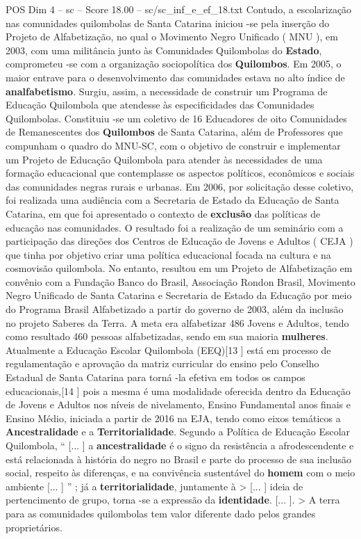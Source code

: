 \begin{textsample}{POS Dim 4 – sc – Score 18.00 – sc/sc\_inf\_e\_ef\_18.txt}
Contudo, a escolarização nas comunidades quilombolas de Santa Catarina iniciou -se pela inserção do Projeto de Alfabetização, no qual o Movimento Negro Unificado ( MNU ), em 2003, com uma militância junto às Comunidades Quilombolas do \textbf{Estado}, comprometeu -se com a organização sociopolítica dos \textbf{Quilombos}.
Em 2005, o maior entrave para o desenvolvimento das comunidades estava no alto índice de \textbf{analfabetismo}.
Surgiu, assim, a necessidade de construir um Programa de Educação Quilombola que atendesse às especificidades das Comunidades Quilombolas.
Constituiu -se um coletivo de 16 Educadores de oito Comunidades de Remanescentes dos \textbf{Quilombos} de Santa Catarina, além de Professores que compunham o quadro do MNU-SC, com o objetivo de construir e implementar um Projeto de Educação Quilombola para atender às necessidades de uma formação educacional que contemplasse os aspectos políticos, econômicos e sociais das comunidades negras rurais e urbanas.
Em 2006, por solicitação desse coletivo, foi realizada uma audiência com a Secretaria de Estado da Educação de Santa Catarina, em que foi apresentado o contexto de \textbf{exclusão} das políticas de educação nas comunidades.
O resultado foi a realização de um seminário com a participação das direções dos Centros de Educação de Jovens e Adultos ( CEJA ) que tinha por objetivo criar uma política educacional focada na cultura e na cosmovisão quilombola.
No entanto, resultou em um Projeto de Alfabetização em convênio com a Fundação Banco do Brasil, Associação Rondon Brasil, Movimento Negro Unificado de Santa Catarina e Secretaria de Estado da Educação por meio do Programa Brasil Alfabetizado a partir do governo de 2003, além da inclusão no projeto Saberes da Terra.
A meta era alfabetizar 486 Jovens e Adultos, tendo como resultado 460 pessoas alfabetizadas, sendo em sua maioria \textbf{mulheres}.
Atualmente a Educação Escolar Quilombola (EEQ)[13 ] está em processo de regulamentação e aprovação da matriz curricular do ensino pelo Conselho Estadual de Santa Catarina para torná -la efetiva em todos os campos educacionais,[14 ] pois a mesma é uma modalidade oferecida dentro da Educação de Jovens e Adultos nos níveis de nivelamento, Ensino Fundamental anos finais e Ensino Médio, iniciada a partir de 2016 na EJA, tendo como eixos temáticos a \textbf{Ancestralidade} e a \textbf{Territorialidade}.
Segundo a Política de Educação Escolar Quilombola, “ [... ] a \textbf{ancestralidade} é o signo da resistência a afrodescendente e está relacionada à história do negro no Brasil e parte do processo de sua inclusão social, respeito às diferenças, e na convivência sustentável do \textbf{homem} com o meio ambiente [... ] ” ; já a \textbf{territorialidade}, juntamente à > [... ] ideia de pertencimento de grupo, torna -se a expressão da \textbf{identidade}. [... ]. > A terra para as comunidades quilombolas tem valor diferente dado pelos grandes proprietários.

\end{textsample}

